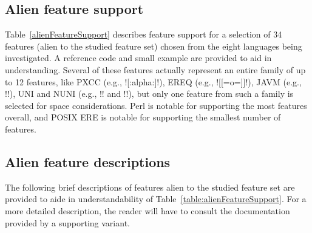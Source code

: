 

\subsection{Alien feature support}
Table~\ref{alienFeatureSupport} describes feature support for a selection of 34 features (alien to the studied feature set) chosen from the eight languages being investigated.  A reference code and small example are provided to aid in understanding.  Several of these features actually represent an entire family of up to 12 features, like PXCC (e.g., \cverb![:alpha:]!), EREQ (e.g., \cverb![[=o=]]!), JAVM (e.g., \cverb!!), UNI and NUNI (e.g., \cverb!\pL! and \cverb!\PM!), but only one feature from such a family is selected for space considerations.  Perl is notable for supporting the most features overall, and POSIX ERE is notable for supporting the smallest number of features.

\subsection{Alien feature descriptions}
The following  brief descriptions of features alien to the studied feature set are provided to aide in understandability of Table~\ref{table:alienFeatureSupport}.  For a more detailed description, the reader will have to consult the documentation provided by a supporting variant.

